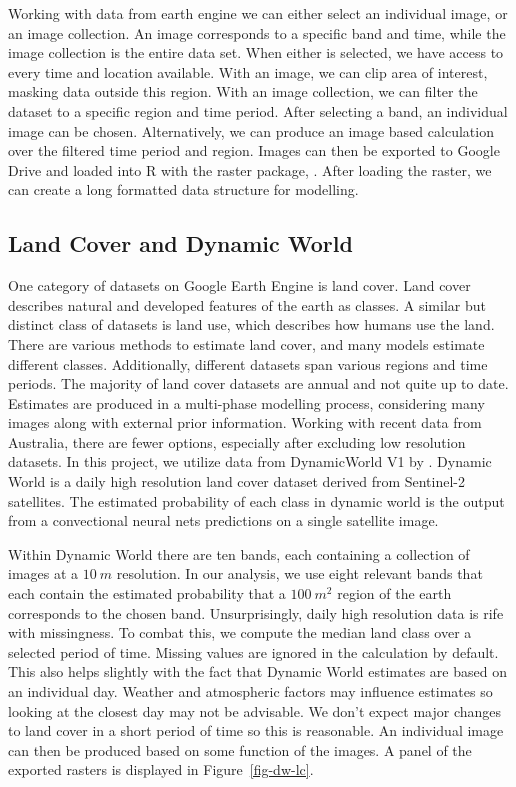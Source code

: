 \documentclass[
  12pt,
  letterpaper,
  DIV=11,
  numbers=noendperiod]{scrartcl}
\begin{document}
Working with data from earth engine we can either select an individual
image, or an image collection. An image corresponds to a specific band
and time, while the image collection is the entire data set. When either
is selected, we have access to every time and location available. With
an image, we can clip area of interest, masking data outside this
region. With an image collection, we can filter the dataset to a
specific region and time period. After selecting a band, an individual
image can be chosen. Alternatively, we can produce an image based
calculation over the filtered time period and region. Images can then be
exported to Google Drive and loaded into R with the raster package,
\citep{raster}. After loading the raster, we can create a long formatted
data structure for modelling.

\subsection{Land Cover and Dynamic
World}\label{land-cover-and-dynamic-world}

One category of datasets on Google Earth Engine is land cover. Land
cover describes natural and developed features of the earth as classes.
A similar but distinct class of datasets is land use, which describes
how humans use the land. There are various methods to estimate land
cover, and many models estimate different classes. Additionally,
different datasets span various regions and time periods. The majority
of land cover datasets are annual and not quite up to date. Estimates
are produced in a multi-phase modelling process, considering many images
along with external prior information. Working with recent data from
Australia, there are fewer options, especially after excluding low
resolution datasets. In this project, we utilize data from DynamicWorld
V1 by \cite{dynamic_world}. Dynamic World is a daily high resolution
land cover dataset derived from Sentinel-2 satellites. The estimated
probability of each class in dynamic world is the output from a
convectional neural nets predictions on a single satellite image.

Within Dynamic World there are ten bands, each containing a collection
of images at a \(10\ m\) resolution. In our analysis, we use eight
relevant bands that each contain the estimated probability that a
\(100\ m^2\) region of the earth corresponds to the chosen band.
Unsurprisingly, daily high resolution data is rife with missingness. To
combat this, we compute the median land class over a selected period of
time. Missing values are ignored in the calculation by default. This
also helps slightly with the fact that Dynamic World estimates are based
on an individual day. Weather and atmospheric factors may influence
estimates so looking at the closest day may not be advisable. We don't
expect major changes to land cover in a short period of time so this is
reasonable. An individual image can then be produced based on some
function of the images. A panel of the exported rasters is displayed in
Figure~\ref{fig-dw-lc}.
\end{document}
